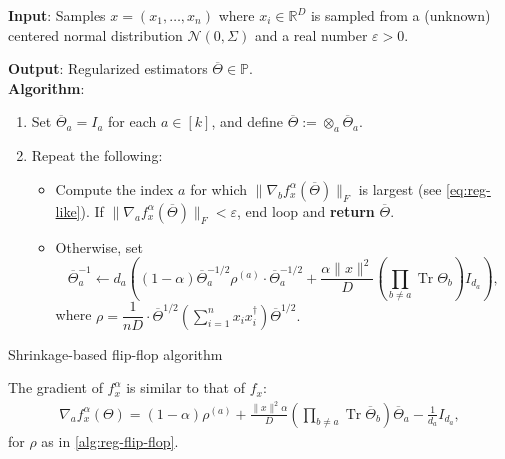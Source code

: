 \documentclass[aos]{imsart}
\theoremstyle{definition}
\numberwithin{equation}{section}
\DeclareMathOperator{\tr}{Tr}
\newcommand{\R}{{\mathbb{R}}}
\newcommand{\otheta}{\overline{\Theta}}
\newcommand{\eps}{\varepsilon}
\newcommand{\cN}{\mathcal{N}}
\newcommand{\SPD}{\mathbb{P}}
\newcommand{\samp}{x}
\begin{document}
\begin{Algorithm}
\textbf{Input}: Samples $\samp = (\samp_1, \ldots, \samp_n)$ where $\samp_i \in \R^D$ is sampled from a (unknown) centered normal distribution $\cN(0, \Sigma)$ and a real number $\eps > 0$.

\textbf{Output}: Regularized estimators $\otheta \in \SPD$.\\[.1ex]

\textbf{Algorithm}:
\begin{enumerate}
\item\label{it:flip-flop step 1 reg} Set $\otheta_a = I_a$ for each $a \in [k]$, and define $\otheta:= \otimes_a \otheta_a$.
\item\label{it:flip-flop step 2 reg} Repeat the following:
\begin{itemize}
\item Compute the index $a$ for which $\|\nabla_b f^\alpha_{\samp}(\otheta)\|_F$ is largest (see \cref{eq:reg-like}). If $\|\nabla_a f^\alpha_\samp(\otheta)\|_F < \eps$, end loop and \textbf{return} $\overline{\Theta}$.
\item Otherwise, set 
$$\otheta_a^{-1} \leftarrow  d_a \left((1 - \alpha) \otheta_a^{-1/2} \rho^{(a)} \cdot \otheta_a^{-1/2} + \frac{\alpha \|x\|^2}{D} (\prod_{b \neq a} \tr \Theta_b) I_{d_a}  \right),$$ 
where $\rho = \dfrac{1}{nD} \cdot  \otheta^{1/2} \left( \sum_{i=1}^n x_ix_i^\dagger \right) \otheta^{1/2}.$


\end{itemize}
\end{enumerate}
\caption{Shrinkage-based flip-flop algorithm}\label{alg:reg-flip-flop}
\end{Algorithm}
The gradient of $f^\alpha_\samp$ is similar to that of $f_\samp$:
\begin{align}\nabla_a f^\alpha_\samp(\Theta) = (1 - \alpha) \rho^{(a)} + \frac{\|x\|^2 \alpha}{D}  (\prod_{b \neq a} \tr \otheta_b ) \otheta_a - \frac{1}{d_a} I_{d_a}, \label{eq:reg-like}
\end{align}
for $\rho$ as in \cref{alg:reg-flip-flop}.
\end{document}
